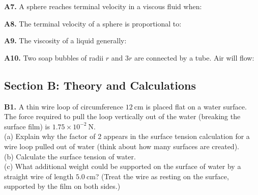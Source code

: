 \begin{exercisebox}[12]

\vspace{0.4cm}

\textbf{A7.} A sphere reaches terminal velocity in
a viscous fluid when:


\vspace{0.4cm}

\textbf{A8.} The terminal velocity of a sphere is
proportional to:


\vspace{0.4cm}

\textbf{A9.} The viscosity of a liquid generally:


\vspace{0.4cm}

\textbf{A10.} Two soap bubbles of radii $r$ and $3r$
are connected by a tube. Air will flow:


\vspace{0.6cm}

\subsection*{Section B: Theory and Calculations}

\textbf{B1.} A thin wire loop of circumference
$12\ \text{cm}$ is placed flat on a water surface.
The force required to pull the loop vertically out
of the water (breaking the surface film) is
$1.75\times10^{-2}\ \text{N}$.\\[4pt]
(a) Explain why the factor of 2 appears in the
surface tension calculation for a wire loop pulled
out of water (think about how many surfaces are
created).\\
(b) Calculate the surface tension of water.\\
(c) What additional weight could be supported on the
surface of water by a straight wire of length
$5.0\ \text{cm}$? (Treat the wire as resting on the
surface, supported by the film on both sides.)
\hfill{}


\end{exercisebox}
